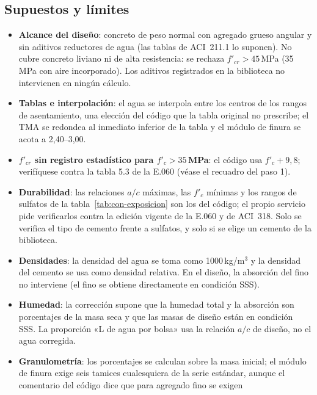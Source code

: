 \subsection{Supuestos y límites}
\label{sec:con-limites}

\begin{itemize}
	\item \textbf{Alcance del diseño}: concreto de peso normal con agregado grueso angular y sin aditivos reductores de
	      agua (las tablas de ACI~211.1 lo suponen). No cubre concreto liviano ni de alta resistencia: se rechaza
	      $f'_{cr} > 45$\,MPa (35\,MPa con aire incorporado). Los aditivos registrados en la biblioteca no intervienen en
	      ningún cálculo.
	\item \textbf{Tablas e interpolación}: el agua se interpola entre los centros de los rangos de asentamiento, una
	      elección del código que la tabla original no prescribe; el TMA se redondea al inmediato inferior de la tabla y
	      el módulo de finura se acota a 2,40--3,00.
	\item \textbf{$f'_{cr}$ sin registro estadístico para $f'_c > 35$\,MPa}: el código usa $f'_c + 9{,}8$; verifíquese
	      contra la tabla 5.3 de la E.060 (véase el recuadro del paso 1).
	\item \textbf{Durabilidad}: las relaciones $a/c$ máximas, las $f'_c$ mínimas y los rangos de sulfatos de la
	      tabla~\ref{tab:con-exposicion} son los del código; el propio servicio pide verificarlos contra la edición
	      vigente de la E.060 y de ACI~318. Solo se verifica el tipo de cemento frente a sulfatos, y solo si se elige un
	      cemento de la biblioteca.
	\item \textbf{Densidades}: la densidad del agua se toma como 1000\,kg/m$^3$ y la densidad del cemento se usa como
	      densidad relativa. En el diseño, la absorción del fino no interviene (el fino se obtiene directamente en
	      condición SSS).
	\item \textbf{Humedad}: la corrección supone que la humedad total y la absorción son porcentajes de la masa seca y
	      que las masas de diseño están en condición SSS. La proporción «L de agua por bolsa» usa la relación $a/c$ de
	      diseño, no el agua corregida.
	\item \textbf{Granulometría}: los porcentajes se calculan sobre la masa inicial; el módulo de finura exige seis
	      tamices cualesquiera de la serie estándar, aunque el comentario del código dice que para agregado fino se exigen

\end{itemize}
